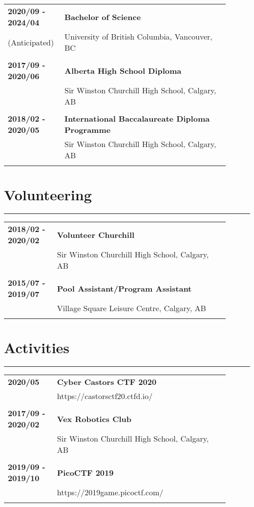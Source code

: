 \documentclass[letterpaper]{article}
\newcommand{\horizontalLine}{%
    \rule{\linewidth}{0.4pt}
    \vspace{1ex}
}
\begin{document}
        \begin{tabular}{p{0.2\linewidth} p{0.7\linewidth}} 
            \textbf{2020/09 - 2024/04} & \large\textbf{Bachelor of Science} \\
            (Anticipated) & University of British Columbia, Vancouver, BC \\
            \\
            \textbf{2017/09 - 2020/06} & \large\textbf{Alberta High School Diploma} \\
            & Sir Winston Churchill High School, Calgary, AB \\
            \\
            \textbf{2018/02 - 2020/05} & \large\textbf{International Baccalaureate Diploma Programme} \\
            & Sir Winston Churchill High School, Calgary, AB \\
            \\
        \end{tabular}

    \section*{Volunteering}

        \horizontalLine

        \begin{tabular}{p{0.2\linewidth} p{0.7\linewidth}} 
            \textbf{2018/02 - 2020/02} & \large\textbf{Volunteer Churchill} \\
            & Sir Winston Churchill High School, Calgary, AB \\
            \\
            \textbf{2015/07 - 2019/07} & \large\textbf{Pool Assistant/Program Assistant} \\
            & Village Square Leisure Centre, Calgary, AB \\
            \\
        \end{tabular}

    \section*{Activities}

        \horizontalLine

        \begin{tabular}{p{0.2\linewidth} p{0.7\linewidth}} 
            \textbf{2020/05} & \large\textbf{Cyber Castors CTF 2020} \\
            & https://castorsctf20.ctfd.io/ \\
            \\
            \textbf{2017/09 - 2020/02} & \large\textbf{Vex Robotics Club} \\
            & Sir Winston Churchill High School, Calgary, AB \\
            \\
            \textbf{2019/09 - 2019/10} & \large\textbf{PicoCTF 2019} \\
            & https://2019game.picoctf.com/ \\
            \\
        \end{tabular}
\end{document}
